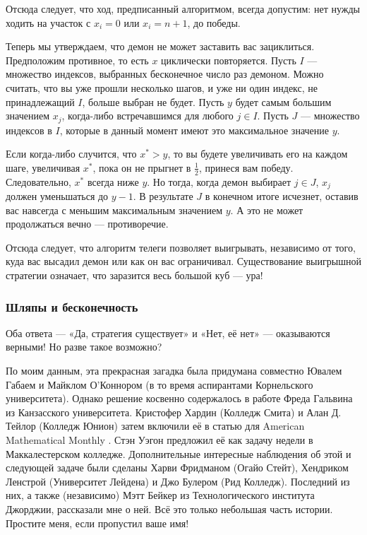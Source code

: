 Отсюда следует, что ход, предписанный алгоритмом, всегда допустим:
нет нужды ходить на участок с $x_i = 0$ или $x_i = n + 1$, до победы.

Теперь мы утверждаем, что демон не может заставить вас зациклиться.
Предположим противное, то есть $x$ циклически повторяется.
Пусть $I$ --- множество индексов, выбранных бесконечное число раз демоном.
Можно считать, что вы уже прошли несколько шагов, и уже ни один индекс, не принадлежащий $I$, больше выбран не будет.
Пусть $y$ будет самым большим значением $x_j$, когда-либо встречавшимся для любого $j \in I$.
Пусть $J$ --- множество индексов в $I$, которые в данный момент имеют это максимальное значение $y$.

Если когда-либо случится, что $x^* > y$, то вы будете увеличивать его на каждом шаге, увеличивая $x^*$, пока он не прыгнет в $\tfrac12$, принеся вам победу.
Следовательно, $x^*$ всегда ниже $y$.
Но тогда, когда демон выбирает $j \in J$, $x_j$ должен уменьшаться до $y - 1$.
В результате $J$ в конечном итоге исчезнет, оставив вас навсегда с меньшим максимальным значением $y$.
А это не может продолжаться вечно --- противоречие.

Отсюда следует, что алгоритм телеги позволяет выигрывать, независимо от того, куда вас высадил демон или как он вас ограничивал.
Существование выигрышной стратегии означает, что заразится весь большой куб --- ура!

\subsubsection*{Шляпы и бесконечность}

Оба ответа --- «Да, стратегия существует» и «Нет, её нет» --- оказываются верными!
Но разве такое возможно?

По моим данным, эта прекрасная загадка была придумана совместно Ювалем Габаем и Майклом О'Коннором (в то время аспирантами Корнельского университета).
Однако решение косвенно содержалось в работе Фреда Гальвина из Канзасского университета.
Кристофер Хардин (Колледж Смита) и Алан Д. Тейлор (Колледж Юнион) затем включили её в статью для American Mathematical Monthly \cite{36}.
Стэн Уэгон предложил её как задачу недели в Маккалестерском колледже.
Дополнительные интересные наблюдения об этой и следующей задаче были сделаны Харви Фридманом (Огайо Стейт), Хендриком Ленстрой (Университет Лейдена) и Джо Булером (Рид Колледж).
Последний из них, а также (независимо) Мэтт Бейкер из Технологического института Джорджии, рассказали мне о ней.
Всё это только небольшая часть истории.
Простите меня, если пропустил ваше имя!

